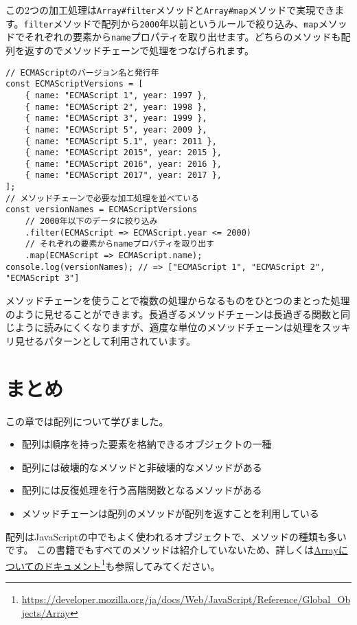 この2つの加工処理は\texttt{Array\#filter}メソッドと\texttt{Array\#map}メソッドで実現できます。\texttt{filter}メソッドで配列から\texttt{2000}年以前というルールで絞り込み、\texttt{map}メソッドでそれぞれの要素から\texttt{name}プロパティを取り出せます。どちらのメソッドも配列を返すのでメソッドチェーンで処理をつなげられます。

\begin{lstlisting}
// ECMAScriptのバージョン名と発行年
const ECMAScriptVersions = [
    { name: "ECMAScript 1", year: 1997 },
    { name: "ECMAScript 2", year: 1998 },
    { name: "ECMAScript 3", year: 1999 },
    { name: "ECMAScript 5", year: 2009 },
    { name: "ECMAScript 5.1", year: 2011 },
    { name: "ECMAScript 2015", year: 2015 },
    { name: "ECMAScript 2016", year: 2016 },
    { name: "ECMAScript 2017", year: 2017 },
];
// メソッドチェーンで必要な加工処理を並べている
const versionNames = ECMAScriptVersions
    // 2000年以下のデータに絞り込み
    .filter(ECMAScript => ECMAScript.year <= 2000)
    // それぞれの要素からnameプロパティを取り出す
    .map(ECMAScript => ECMAScript.name);
console.log(versionNames); // => ["ECMAScript 1", "ECMAScript 2", "ECMAScript 3"]
\end{lstlisting}

メソッドチェーンを使うことで複数の処理からなるものをひとつのまとった処理のように見せることができます。長過ぎるメソッドチェーンは長過ぎる関数と同じように読みにくくなりますが、適度な単位のメソッドチェーンは処理をスッキリ見せるパターンとして利用されています。

\hypertarget{conclusion}{%
\section{まとめ}\label{conclusion}}

この章では配列について学びました。

\begin{itemize}
\item
  配列は順序を持った要素を格納できるオブジェクトの一種
\item
  配列には破壊的なメソッドと非破壊的なメソッドがある
\item
  配列には反復処理を行う高階関数となるメソッドがある
\item
  メソッドチェーンは配列のメソッドが配列を返すことを利用している
\end{itemize}

配列はJavaScriptの中でもよく使われるオブジェクトで、メソッドの種類も多いです。
この書籍でもすべてのメソッドは紹介していないため、詳しくは\href{https://developer.mozilla.org/ja/docs/Web/JavaScript/Reference/Global_Objects/Array}{Arrayについてのドキュメント}\footnote{\url{https://developer.mozilla.org/ja/docs/Web/JavaScript/Reference/Global_Objects/Array}}も参照してみてください。
